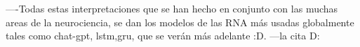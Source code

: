 
----Todas estas interpretaciones que se han hecho en conjunto con las muchas areas de la neurociencia, se dan los modelos de las RNA más usadas globalmente tales como chat-gpt, lstm,gru, que se verán más adelante :D. ---la cita D:





